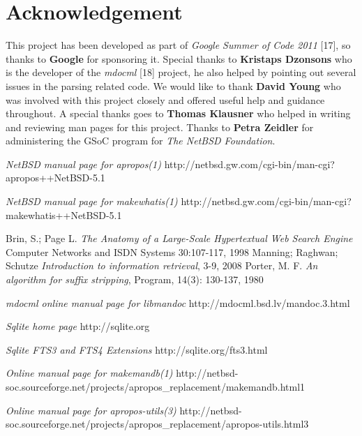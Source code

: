 \documentclass[titlepage, a4paper, 12pt]{article}
\begin{document}
\section{Acknowledgement}
This project has been developed as part of \emph{Google Summer of Code 2011}
[17], so thanks to \textbf{Google} for sponsoring it. Special thanks to
\textbf{Kristaps Dzonsons} who is the developer of the \textit{mdocml} [18]
project, he also helped by pointing out several issues in the parsing related
code. We would like to thank \textbf{David Young} who was involved with
this project closely and offered useful help and guidance throughout. A special
thanks goes to \textbf{Thomas Klausner} who helped in writing and reviewing
man pages for this project. Thanks to \textbf{Petra Zeidler} for administering
the GSoC program for \textit{The NetBSD Foundation}.
\begin{thebibliography}{20}
\emph{NetBSD manual page for apropos(1)}
\newline http://netbsd.gw.com/cgi-bin/man-cgi?apropos++NetBSD-5.1

\emph{NetBSD manual page for makewhatis(1)}
\newline http://netbsd.gw.com/cgi-bin/man-cgi?makewhatis++NetBSD-5.1

Brin, S.; Page L.
\emph{The Anatomy of a Large-Scale Hypertextual Web Search Engine}
Computer Networks and ISDN Systems
30:107-117, 1998
Manning; Raghwan; Schutze
\emph{Introduction to information retrieval},
3-9,
2008
Porter, M. F.
\emph{An algorithm for suffix stripping},
Program,
14(3): 130-137,
1980

\emph{mdocml online manual page for
libmandoc}
\newline http://mdocml.bsd.lv/mandoc.3.html

\emph{Sqlite home page}
\newline http://sqlite.org

\emph{Sqlite FTS3 and FTS4 Extensions}
\newline  http://sqlite.org/fts3.html

\emph{Online manual page for makemandb(1)}
\newline http://netbsd-soc.sourceforge.net/projects/apropos\_replacement/makemandb.html1

\emph{Online manual page for apropos-utils(3)}
\newline http://netbsd-soc.sourceforge.net/projects/apropos\_replacement/apropos-utils.html3


\end{thebibliography}
\end{document}
